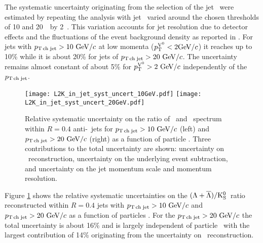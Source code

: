 

The systematic uncertainty originating from the selection of the jet \pt\ were estimated by repeating the analysis with jet \pt\ varied around the chosen thresholds of 10 and 20~\gevc\ by 2~\gevc. 
This variation accounts for jet resolution due to detector effects and the fluctuations of the event background density as reported in \cite{Adam:2015hoa}. 
For jets with $p_\mathrm{T\,ch\;jet}>10~\mathrm{GeV}/c$ at low momenta ($ p_{\mathrm{T}}^{{\rm V}^{0}} <2\mathrm{GeV}/c$) it reaches up to 10\% while it is about 20\% for jets of $p_\mathrm{T\,ch\;jet}>20~\mathrm{GeV}/c$. The uncertainty remains almost constant of about 5\% for $ p_{\mathrm{T}}^{{\rm V}^{0}}  > 2~\mathrm{GeV}/c$ independently of the $p_\mathrm{T\,ch\;jet}$. 

\begin{figure}[htbp]
	\centering
	\texttt{[image: L2K\_in\_jet\_syst\_uncert\_10GeV.pdf]}
	\texttt{[image: L2K\_in\_jet\_syst\_uncert\_20GeV.pdf]}
	\caption{Relative systematic uncertainty on the ratio of \lda\ and \ks\ spectrum within $R=0.4$ anti-\kt\ jets for $p_\mathrm{T\,ch\;jet}>10~\mathrm{GeV}/c$ (left) and $p_\mathrm{T\,ch\;jet}>20~\mathrm{GeV}/c$ (right) as a function of particle \pt. Three contributions to the total uncertainty are shown: uncertainty on \vzero\ reconstruction, uncertainty on the underlying event subtraction, and uncertainty on the jet momentum scale and momentum resolution. }
	\label{fig:systUncertRatio}
\end{figure}

Figure \ref{fig:systUncertRatio} shows the relative systematic uncertainties on the $(\Lambda+\overline{\Lambda})/\rm{K}^{0}_{\rm S}$\ ratio reconstructed within $R=0.4$ jets with $p_\mathrm{T\,ch\;jet} > 10~\mathrm{GeV}/c$ and $p_\mathrm{T\,ch\;jet} > 20~\mathrm{GeV}/c$ as a function of particles \pt. 
For the $p_\mathrm{T\,ch\;jet} > 20~\mathrm{GeV}/c$ the total uncertainty is about 16\% and is largely independent of particle \pt\ with the largest contribution of 14\% originating from the uncertainty on \Vzero\ reconstruction.


